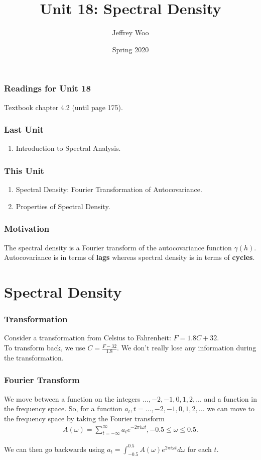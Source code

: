 \documentclass[%
xcolor=pdftex]{beamer}
\title{Unit 18: Spectral Density}
\author[STAT 5170: Applied Time Series, Unit 18]{Jeffrey Woo}
\institute{Department of Statistics, University of Virginia}
\date{Spring 2020} %
\begin{document}
\frame{\titlepage}


\begin{frame}
\frametitle{Readings for Unit 18}

Textbook chapter 4.2 (until page 175).

\end{frame}



\begin{frame}
\frametitle{Last Unit}
\begin{enumerate}
\item Introduction to Spectral Analysis.
\end{enumerate}
\end{frame}

\begin{frame}
\frametitle{This Unit}
\begin{enumerate}
\item Spectral Density: Fourier Transformation of Autocovariance.
\item Properties of Spectral Density.
\end{enumerate}
\end{frame}

\begin{frame}
\frametitle{Motivation}

The spectral density is a Fourier transform of the autocovariance function $\gamma(h)$. Autocovariance is in terms of \textbf{lags} whereas spectral density is in terms of \textbf{cycles}.

\end{frame}

\section{Spectral Density}
\frame{\tableofcontents[currentsection]}

\begin{frame}
\frametitle{Transformation}

Consider a transformation from Celsius to Fahrenheit: $F = 1.8C + 32$. \\
\vspace{5mm}
To transform back, we use $C = \frac{F-32}{1.8}$. We don't really lose any information during the transformation.

\end{frame}

\begin{frame}
\frametitle{Fourier Transform}


We move between a function on the integers $...,-2,-1,0,1,2,...$ and a function in the frequency space. So, for
a function $a_t, t=...,-2,-1,0,1,2,...$ we can move to the
frequency space by taking the Fourier transform
\begin{eqnarray*}
A(\omega) = \sum_{t=-\infty}^{\infty} a_t e^{-2 \pi i \omega t}, -0.5\leq \omega \leq 0.5.
\end{eqnarray*}

We can then go backwards using $a_t=\int_{-0.5}^{0.5} A(\omega) e^{2
\pi i \omega t} d\omega$ for each $t$.

\end{frame}
\end{document}
